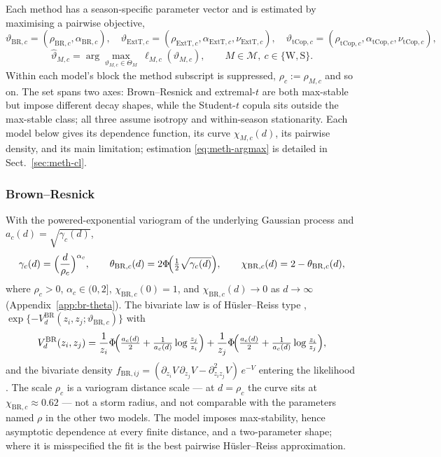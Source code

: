 Each method has a season-specific parameter vector and is estimated by maximising a pairwise objective,
\begin{equation}
  \vartheta_{\mathrm{BR},c}=(\rho_{\mathrm{BR},c},\alpha_{\mathrm{BR},c}),\quad
  \vartheta_{\mathrm{ExtT},c}=(\rho_{\mathrm{ExtT},c},\alpha_{\mathrm{ExtT},c},\nu_{\mathrm{ExtT},c}),\quad
  \vartheta_{\mathrm{tCop},c}=(\rho_{\mathrm{tCop},c},\alpha_{\mathrm{tCop},c},\nu_{\mathrm{tCop},c}),
\end{equation}
\begin{equation}\label{eq:meth-argmax}
  \widehat\vartheta_{M,c}=\arg\max_{\vartheta_{M,c}\in\Theta_M}\ \ell_{M,c}(\vartheta_{M,c}),
  \qquad M\in\mathcal M,\ c\in\{\mathrm W,\mathrm S\}.
\end{equation}
Within each model's block the method subscript is suppressed, \(\rho_c:=\rho_{M,c}\) and so on. The set spans two axes: Brown--Resnick and extremal-\(t\) are both max-stable but impose different decay shapes, while the Student-\(t\) copula sits outside the max-stable class; all three assume isotropy and within-season stationarity. Each model below gives its dependence function, its curve \(\chi_{M,c}(d)\), its pairwise density, and its main limitation; estimation \eqref{eq:meth-argmax} is detailed in Sect.~\ref{sec:meth-cl}.

\subsubsection{Brown--Resnick}\label{sec:meth-br}\label{sec:meth-variogram}

With the powered-exponential variogram of the underlying Gaussian process \citep{brown1977,kabluchko2009} and \(a_c(d)=\sqrt{\gamma_c(d)}\),
\begin{equation}\label{eq:meth-br-chi}
  \gamma_c(d)=\Bigl(\frac{d}{\rho_c}\Bigr)^{\alpha_c},
  \qquad
  \theta_{\mathrm{BR},c}(d)=2\Phi\!\Bigl(\tfrac12\sqrt{\gamma_c(d)}\Bigr),
  \qquad
  \chi_{\mathrm{BR},c}(d)=2-\theta_{\mathrm{BR},c}(d),
\end{equation}
where \(\rho_c>0\), \(\alpha_c\in(0,2]\), \(\chi_{\mathrm{BR},c}(0)=1\), and \(\chi_{\mathrm{BR},c}(d)\to0\) as \(d\to\infty\) (Appendix~\ref{app:br-theta}). The bivariate law is of H\"usler--Reiss type \citep{husler1989}, \(\exp\{-V^{\mathrm{BR}}_d(z_i,z_j;\vartheta_{\mathrm{BR},c})\}\) with
\begin{equation}
  V^{\mathrm{BR}}_d(z_i,z_j)
  =\frac{1}{z_i}\Phi\!\Bigl(\tfrac{a_c(d)}{2}+\tfrac{1}{a_c(d)}\log\tfrac{z_j}{z_i}\Bigr)
  +\frac{1}{z_j}\Phi\!\Bigl(\tfrac{a_c(d)}{2}+\tfrac{1}{a_c(d)}\log\tfrac{z_i}{z_j}\Bigr),
\end{equation}
and the bivariate density \(f_{\mathrm{BR},ij}=(\partial_{z_i}V\,\partial_{z_j}V-\partial^2_{z_iz_j}V)\,e^{-V}\) entering the likelihood \citep{padoan2010,huser2013}. The scale \(\rho_c\) is a variogram distance scale --- at \(d=\rho_c\) the curve sits at \(\chi_{\mathrm{BR},c}\approx0.62\) --- not a storm radius, and not comparable with the parameters named \(\rho\) in the other two models. The model imposes max-stability, hence asymptotic dependence at every finite distance, and a two-parameter shape; where it is misspecified the fit is the best pairwise H\"usler--Reiss approximation.

